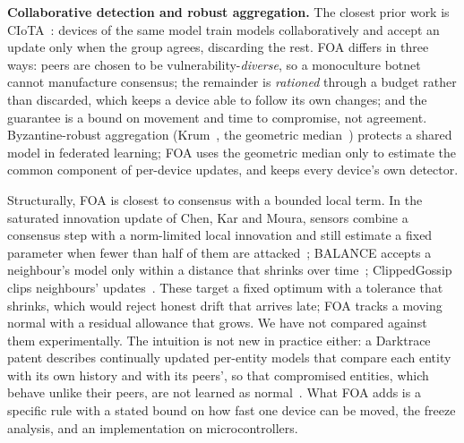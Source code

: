 \textbf{Collaborative detection and robust aggregation.} The closest prior work is
CIoTA~\cite{ciota}: devices of the same model train models collaboratively and accept an update only
when the group agrees, discarding the rest. FOA differs in three ways: peers are chosen to be
vulnerability-\emph{diverse}, so a monoculture botnet cannot manufacture consensus; the remainder is
\emph{rationed} through a budget rather than discarded, which keeps a device able to follow its own
changes; and the guarantee is a bound on movement and time to compromise, not agreement. Byzantine-robust
aggregation (Krum~\cite{krum}, the geometric median~\cite{lopuhaa,minsker}) protects a shared model in
federated learning; FOA uses the geometric median only to estimate the common component of per-device
updates, and keeps every device's own detector.

Structurally, FOA is closest to consensus with a bounded local term. In the saturated innovation update
of Chen, Kar and Moura, sensors combine a consensus step with a norm-limited local innovation and still
estimate a fixed parameter when fewer than half of them are attacked~\cite{siu}; BALANCE accepts a
neighbour's model only within a distance that shrinks over time~\cite{balance}; ClippedGossip clips
neighbours' updates~\cite{clippedgossip}. These target a fixed optimum with a tolerance that shrinks,
which would reject honest drift that arrives late; FOA tracks a moving normal with a residual allowance
that grows. We have not compared against them experimentally. The intuition is not new in practice either: a
Darktrace patent describes continually updated per-entity models that compare each entity with its own
history and with its peers', so that compromised entities, which behave unlike their peers, are not
learned as normal~\cite{darktrace}. What FOA adds is a specific rule with a stated bound on how fast one device
can be moved, the freeze analysis, and an implementation on microcontrollers.
